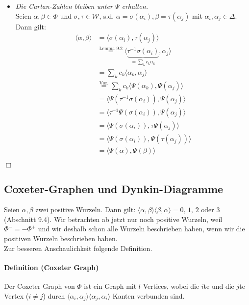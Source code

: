 \documentclass[a4paper,12pt]{article}
\begin{document}
\begin{itemize}
\begin{itemize}
\item \emph{Die Cartan-Zahlen bleiben unter $\Psi$ erhalten.}\\
Seien $\alpha,\beta\in\Phi$ und $\sigma,\tau\in\mathcal{W}$, s.d. $\alpha=\sigma(\alpha_i),\beta=\tau(\alpha_j)$ mit $\alpha_i,\alpha_j \in\Delta$.\\
Dann gilt: 
\begin{align*}
\langle\alpha,\beta\rangle &= \langle \sigma(\alpha_i),\tau(\alpha_j) \rangle\\
&\overset{\text{Lemma 9.2}}{=} \langle \underbrace{ \tau^{-1} \sigma(\alpha_i)}_{=\sum_k c_k \alpha_k},\alpha_j \rangle\\
&= \sum_k c_k \langle\alpha_k,\alpha_j\rangle\\
&\overset{\text{Vor.}}{=} \sum_k c_k \langle\Psi(\alpha_k),\Psi(\alpha_j)\rangle\\
&= \langle \Psi(\tau^{-1}\sigma(\alpha_i)),\Psi(\alpha_j)\rangle\\
&= \langle \tau^{-1}\Psi(\sigma(\alpha_i)),\Psi(\alpha_j)\rangle\\
&= \langle \Psi(\sigma(\alpha_i)),\tau\Psi(\alpha_j)\rangle\\
&= \langle \Psi(\sigma(\alpha_i)),\Psi(\tau(\alpha_j))\rangle\\
&= \langle\Psi(\alpha),\Psi(\beta)\rangle
\end{align*}


\end{itemize}
\hfill $\Box$\\



\end{itemize}


\subsection{Coxeter-Graphen und Dynkin-Diagramme}
Seien $\alpha, \beta$ zwei positive Wurzeln. Dann gilt: $\langle \alpha, \beta\rangle\langle\beta, \alpha\rangle = 0,\, 1,\, 2 \text{ oder } 3$ (Abschnitt 9.4). Wir betrachten ab jetzt nur noch positive Wurzeln, weil $\Phi^- = -\Phi^+$ und wir deshalb schon alle Wurzeln beschrieben haben, wenn wir die positiven Wurzeln beschrieben haben.\\
Zur besseren Anschaulichkeit folgende Definition.
\paragraph{Definition (Coxeter Graph)} Der Coxeter Graph von $\Phi$ ist ein Graph mit $l$ Vertices, wobei die $i$te und die $j$te Vertex ($i\neq j$) durch $\langle \alpha_i, \alpha_j\rangle\langle\alpha_j, \alpha_i\rangle$ Kanten verbunden sind.
\end{document}
